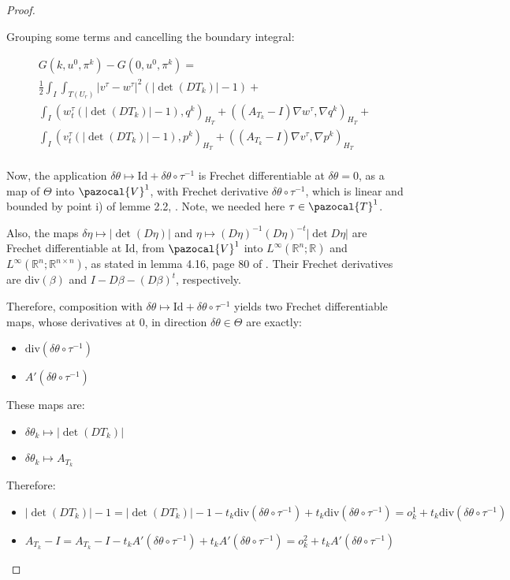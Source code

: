 \documentclass[english,a4paper,10pt,oneside]{scrbook}	%
\theoremstyle{break}
\newenvironment{mproof}[1][\proofname]{%
  \begin{proof}[#1]$ $\par\nobreak\ignorespaces
}{%
  \end{proof}
}
\renewcommand*{\proofname}{Proof}
\theoremstyle{remark}
\newcommand{\mR}{\mathbb{R}}
\newcommand{\cV}{\pazocal{V}}
\newcommand{\cT}{\pazocal{T}}
\newcommand{\id}{\text{Id}}
\newcommand{\te}{\theta}
\newcommand{\Te}{\Theta}
\newcommand{\dive}{\text{div}}
\begin{document}
\begin{mproof}
Grouping some terms and cancelling the boundary integral:

\begin{align*}
G(k,u^0,\pi^k)-G(0,u^0,\pi^k) =\\
\frac{1}{2}\int_I \int_{T(U_r)}|v^\tau-w^\tau|^2(|\det(DT_k)|-1)+\\
\int_I ( w_t^\tau (|\det(DT_k)| -1), q^k)_{H_T}+ ((A_{T_k}-I)\nabla w^\tau, \nabla q^k)_{H_T}+\\
\int_I (v_t^\tau (|\det(DT_k)|-1),p^k )_{H_T} + ((A_{T_k}-I) \nabla v^\tau, \nabla p^k)_{H_T} \\
\end{align*}

Now, the application $\delta \te \mapsto \id +\delta \te \circ \tau^{-1}$ is Frechet differentiable at $\delta \te =0$, as a map of $\Te$ into $\cV^1$, with Frechet derivative $\delta \te \circ \tau^{-1}$, which is linear and bounded by point i) of lemme 2.2, \cite{murat}. Note, we needed here $\tau \in \cT^1$.

Also, the maps $\delta \eta \mapsto |\det(D\eta)|$ and $\eta\mapsto (D\eta)^{-1}(D\eta)^{-t}|\det D\eta|$ are Frechet differentiable at $\id$, from $\cV^1$ into $L^\infty(\mR^n;\mR)$ and $L^\infty(\mR^n;\mR^{n\times n})$, as stated in lemma 4.16, page 80 of \cite{lindemann}. Their Frechet derivatives are $\dive (\beta)$ and $I-D\beta-(D\beta)^t$, respectively.

Therefore, composition with  $\delta \te  \mapsto \id+ \delta \te \circ \tau^{-1}$ yields two Frechet differentiable maps, whose derivatives at $0$, in direction $\delta \te \in \Te$ are exactly:

\begin{itemize}
	\item $\dive(\delta \te \circ \tau^{-1})$
	\item $A'(\delta \te \circ \tau^{-1})$
\end{itemize} 

These maps are:

\begin{itemize}
	\item $\delta \te_k \mapsto |\det(DT_k)|$
	\item $\delta \te_k \mapsto A_{T_k}$
\end{itemize}

Therefore:

\begin{itemize}
	\item $|\det(DT_k)|-1 = |\det(DT_k)|-1 - t_k\dive(\delta \te \circ \tau^{-1})+t_k\dive(\delta \te \circ \tau^{-1}) = o^1_k + t_k\dive(\delta \te \circ \tau^{-1})$
	\item $A_{T_k}-I = A_{T_k}-I - t_k A'(\delta \te \circ \tau^{-1}) + t_k A'(\delta \te \circ \tau^{-1}) = o_k^2 + t_k A'(\delta \te \circ \tau^{-1}) $
\end{itemize}


\end{mproof}
\end{document}
